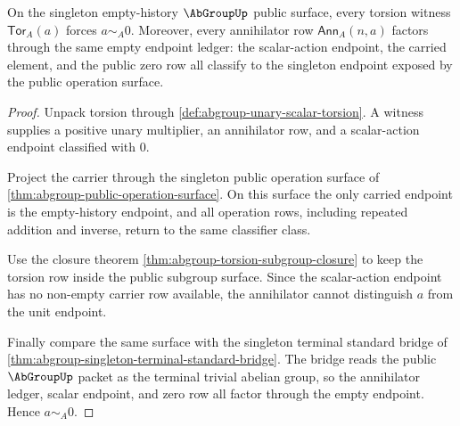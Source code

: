 \begin{theorem}
\label{thm:abgroup-singleton-torsion-unit-exhaustion}
On the singleton empty-history $\AbGroupUp$ public surface, every torsion witness $\mathsf{Tor}_A(a)$ forces $a\sim_A0$. Moreover, every annihilator row $\mathsf{Ann}_A(n,a)$ factors through the same empty endpoint ledger: the scalar-action endpoint, the carried element, and the public zero row all classify to the singleton endpoint exposed by the public operation surface.
\end{theorem}
\begin{proof}
Unpack torsion through \autoref{def:abgroup-unary-scalar-torsion}. A witness supplies a positive unary multiplier, an annihilator row, and a scalar-action endpoint classified with $0$.

Project the carrier through the singleton public operation surface of \autoref{thm:abgroup-public-operation-surface}. On this surface the only carried endpoint is the empty-history endpoint, and all operation rows, including repeated addition and inverse, return to the same classifier class.

Use the closure theorem \autoref{thm:abgroup-torsion-subgroup-closure} to keep the torsion row inside the public subgroup surface. Since the scalar-action endpoint has no non-empty carrier row available, the annihilator cannot distinguish $a$ from the unit endpoint.

Finally compare the same surface with the singleton terminal standard bridge of \autoref{thm:abgroup-singleton-terminal-standard-bridge}. The bridge reads the public $\AbGroupUp$ packet as the terminal trivial abelian group, so the annihilator ledger, scalar endpoint, and zero row all factor through the empty endpoint. Hence $a\sim_A0$.
\end{proof}


